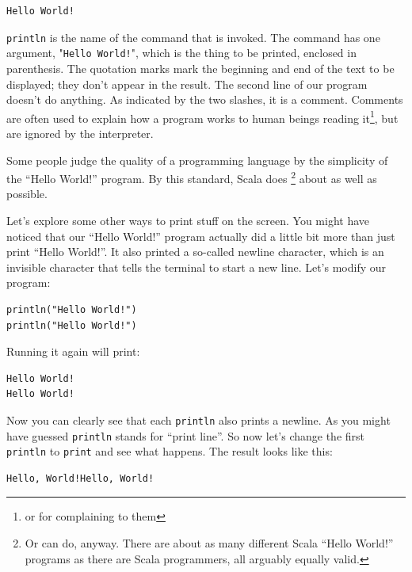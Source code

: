 \documentclass[10pt]{book}
\begin{document}
\beforeverb
\begin{verbatim}
Hello World!
\end{verbatim}
\afterverb

{\tt println} is the name of the command that is invoked. The command has one argument,
{\verb"""\verb"Hello World!"\verb"""}, which is the thing to be printed, enclosed in parenthesis. The quotation marks mark the beginning and end of the text to be displayed; they don't appear in the result. The second line of our program doesn't do anything. As indicated by the two slashes, it is a comment. Comments are often used to explain how a program works to human beings reading it\footnote{or for complaining to them}, but are ignored by the interpreter. 


Some people judge the quality of a programming language by the simplicity of the ``Hello World!'' program.  By this standard, Scala does \footnote{Or can do, anyway. There are about as many different Scala ``Hello World!'' programs as there are Scala programmers, all arguably equally valid.} about as well as possible.

Let's explore some other ways to print stuff on the screen. You might have noticed that our ``Hello World!'' program actually did a little bit more than just print ``Hello World!''. It also printed a so-called newline character, which is an invisible character that tells the terminal to start a new line. Let's modify our program:

\beforeverb
\begin{verbatim}
println("Hello World!")
println("Hello World!")
\end{verbatim}
\afterverb

Running it again will print:

\beforeverb
\begin{verbatim}
Hello World!
Hello World!
\end{verbatim}
\afterverb

Now you can clearly see that each {\tt println} also prints a newline. As you might have guessed {\tt println} stands for ``print line''. So now let's change the first {\tt println} to {\tt print} and see what happens. The result looks like this:

\beforeverb
\begin{verbatim}
Hello, World!Hello, World!
\end{verbatim}
\afterverb
\end{document}
